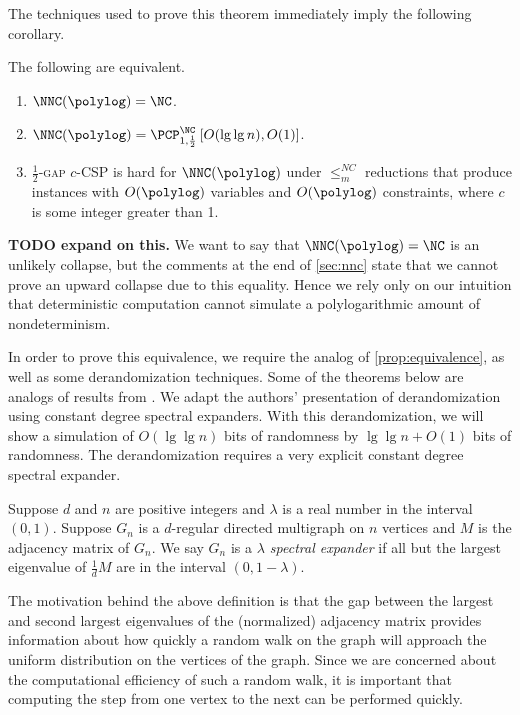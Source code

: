 \documentclass[]{article}
\newcommand{\PCPcs}[5]{\PCP^{#1}_{#2, #3}\left[#4, #5\right]}
\begin{document}
The techniques used to prove this theorem immediately imply the following corollary.

\begin{corollary}
  The following are equivalent.
  \begin{enumerate}
  \item $\NNC(\polylog) = \NC$.
  \item $\NNC(\polylog) = \PCPcs{\NC}{1}{\frac{1}{2}}{O(\lg \lg n)}{O(1)}$.
  \item \textsc{$\frac{1}{2}$-gap $c$-CSP} is hard for $\NNC(\polylog)$ under $\leq_m^{NC}$ reductions that produce instances with $O(\polylog)$ variables and $O(\polylog)$ constraints, where $c$ is some integer greater than 1.
  \end{enumerate}
\end{corollary}

\textbf{TODO expand on this.}
We want to say that $\NNC(\polylog) = \NC$ is an unlikely collapse, but the comments at the end of \autoref{sec:nnc} state that we cannot prove an upward collapse due to this equality.
Hence we rely only on our intuition that deterministic computation cannot simulate a polylogarithmic amount of nondeterminism.

In order to prove this equivalence, we require the \NC{} analog of \autoref{prop:equivalence}, as well as some derandomization techniques.
Some of the theorems below are \NC{} analogs of results from \cite{fs96}.
We adapt the authors' presentation of derandomization using constant degree spectral expanders.
With this derandomization, we will show a simulation of $O(\lg \lg n)$ bits of randomness by $\lg \lg n + O(1)$ bits of randomness.
The derandomization requires a very explicit constant degree spectral expander.

\begin{definition}
  Suppose $d$ and $n$ are positive integers and $\lambda$ is a real number in the interval $(0, 1)$.
  Suppose $G_n$ is a $d$-regular directed multigraph on $n$ vertices and $M$ is the adjacency matrix of $G_n$.
  We say $G_n$ is a \emph{$\lambda$ spectral expander} if all but the largest eigenvalue of $\frac{1}{d}M$ are in the interval $(0, 1 - \lambda)$.
\end{definition}

The motivation behind the above definition is that the gap between the largest and second largest eigenvalues of the (normalized) adjacency matrix provides information about how quickly a random walk on the graph will approach the uniform distribution on the vertices of the graph.
Since we are concerned about the computational efficiency of such a random walk, it is important that computing the step from one vertex to the next can be performed quickly.
\end{document}
